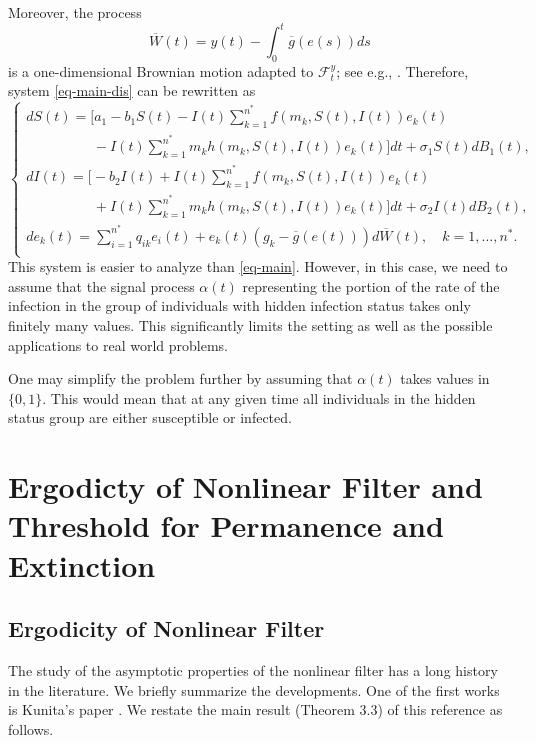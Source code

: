 \documentclass[12pt]{amsart}
\theoremstyle{remark}
\numberwithin{equation}{section}
\newcommand{\F}{\mathcal{F}}
\numberwithin{equation}{section}
\newcommand{\1}{\boldsymbol{1}}
\def\bar{\overline}
\begin{document}
Moreover, the process
$$
\bar W(t)=y(t)-\int_0^t \bar g(e(s))ds
$$
is a one-dimensional Brownian motion adapted to $\F_t^y$; see e.g., \cite[Theorem 7.2]{LS01}. Therefore,  system \eqref{eq-main-dis} can be rewritten as
\begin{equation}\label{eq-main-dis-1}
\begin{cases}
dS(t)=\Big[a_1-b_1S(t)-I(t)\sum_{k=1}^{n^*}f(m_k,S(t),I(t))e_k(t)
\\
\hspace{2cm}
-I(t)\sum_{k=1}^{n^*}m_kh(m_k,S(t),I(t))e_k(t)\Big]dt + \sigma_1 S(t) dB_1(t),\\[1ex]
dI(t)=\Big[-b_2I(t) + I(t)\sum_{k=1}^{n^*}f(m_k,S(t),I(t))e_k(t)
\\
\hspace{2cm}
+I(t)\sum_{k=1}^{n^*}m_kh(m_k,S(t),I(t))e_k(t)\Big]dt + \sigma_2I(t) dB_2(t),\\
de_k(t)=\sum_{i=1}^{n^*} q_{ik}e_i(t)+e_k(t)(g_k-\bar g(e(t)))d\bar W(t),\quad  k=1,\dots,n^*.\\
\end{cases}
\end{equation}
This system is easier to analyze than \eqref{eq-main}. However, in this case, we need to assume that the signal process $\alpha(t)$ representing the portion of the rate of the infection in the group of individuals with hidden infection status takes only finitely many values.
This significantly limits the setting as well as the possible applications to real world problems.

One may simplify the problem further by assuming that $\alpha(t)$ takes values in $\{0,1\}$. This would mean that at any given time all individuals in the hidden status group are either susceptible or infected.

\section{Ergodicty of Nonlinear Filter and Threshold for Permanence and Extinction}\label{sec:thres}
\subsection{Ergodicity of Nonlinear Filter}\label{sec:filter}
The study of the asymptotic properties of the nonlinear filter has a long history in the literature. We briefly summarize the developments. One of the first works is Kunita's paper \cite{Kun71}.
We restate the main result (Theorem 3.3) of this reference as follows.
\end{document}
